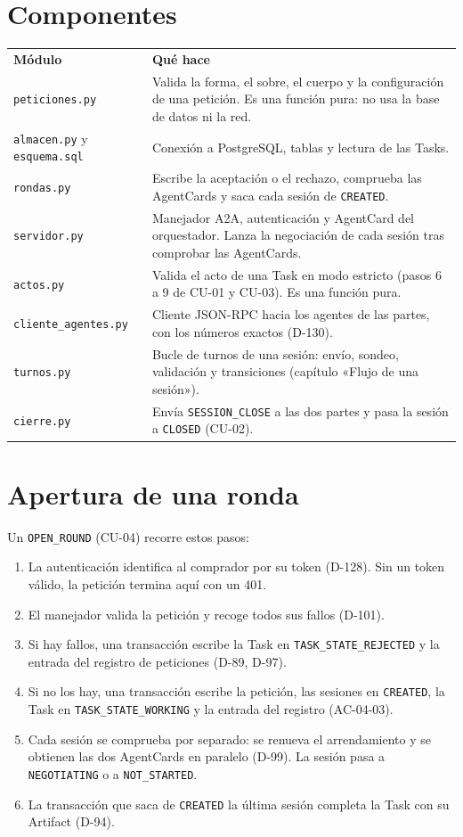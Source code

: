 \section{Componentes}

\begin{tabular}{p{4cm}p{9.5cm}}
  \textbf{Módulo} & \textbf{Qué hace} \\
  \texttt{peticiones.py} & Valida la forma, el sobre, el cuerpo y la configuración de una petición. Es una función pura: no usa la base de datos ni la red. \\
  \texttt{almacen.py} y \texttt{esquema.sql} & Conexión a PostgreSQL, tablas y lectura de las Tasks. \\
  \texttt{rondas.py} & Escribe la aceptación o el rechazo, comprueba las AgentCards y saca cada sesión de \texttt{CREATED}. \\
  \texttt{servidor.py} & Manejador A2A, autenticación y AgentCard del orquestador. Lanza la negociación de cada sesión tras comprobar las AgentCards. \\
  \texttt{actos.py} & Valida el acto de una Task en modo estricto (pasos 6 a 9 de CU-01 y CU-03). Es una función pura. \\
  \texttt{cliente\_agentes.py} & Cliente JSON-RPC hacia los agentes de las partes, con los números exactos (D-130). \\
  \texttt{turnos.py} & Bucle de turnos de una sesión: envío, sondeo, validación y transiciones (capítulo «Flujo de una sesión»). \\
  \texttt{cierre.py} & Envía \texttt{SESSION\_CLOSE} a las dos partes y pasa la sesión a \texttt{CLOSED} (CU-02). \\
\end{tabular}

\section{Apertura de una ronda}

Un \texttt{OPEN\_ROUND} (CU-04) recorre estos pasos:

\begin{enumerate}
  \item La autenticación identifica al comprador por su token (D-128). Sin un token válido, la petición termina aquí con un 401.
  \item El manejador valida la petición y recoge todos sus fallos (D-101).
  \item Si hay fallos, una transacción escribe la Task en \texttt{TASK\_STATE\_REJECTED} y la entrada del registro de peticiones (D-89, D-97).
  \item Si no los hay, una transacción escribe la petición, las sesiones en \texttt{CREATED}, la Task en \texttt{TASK\_STATE\_WORKING} y la entrada del registro (AC-04-03).
  \item Cada sesión se comprueba por separado: se renueva el arrendamiento y se obtienen las dos AgentCards en paralelo (D-99). La sesión pasa a \texttt{NEGOTIATING} o a \texttt{NOT\_STARTED}.
  \item La transacción que saca de \texttt{CREATED} la última sesión completa la Task con su Artifact (D-94).
\end{enumerate}

